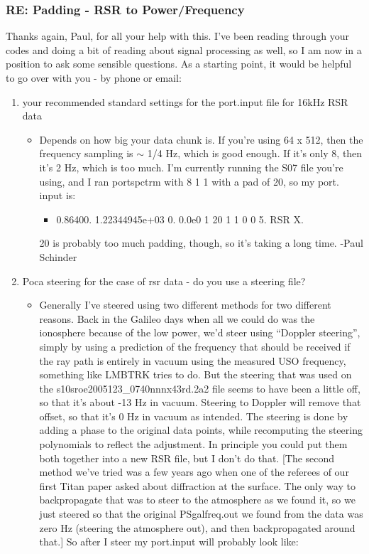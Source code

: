 \documentclass[crop=false,class=article,oneside]{standalone}
\begin{document}
\subsubsection{\footnotesize RE: Padding - RSR to Power/Frequency}
Thanks again, Paul, for all your help with this. I've been reading through your codes and doing a bit of reading about signal processing as well, so I am now in a position to ask some sensible questions. As a starting point, it would be helpful to go over with you - by phone or email:
\begin{enumerate}
    \item your recommended standard settings for the port.input file for 16kHz RSR data
    \begin{itemize}
        \item Depends on how big your data chunk is. If you’re using 64 x 512, then the frequency sampling is $\sim$ 1/4 Hz, which is good enough.  If it’s only 8, then it’s 2 Hz, which is too much. I’m currently running the S07 file you’re using, and I ran portspctrm with 8 1 1 with a pad of 20, so my port. input is:
        \begin{itemize}
            \item 0.86400. 1.22344945e+03 0. 0.0e0 1 20 1 1 0 0 5. RSR X.
        \end{itemize}
        20 is probably too much padding, though, so it’s taking a long time. -Paul Schinder
    \end{itemize}
    \item  Poca steering for the case of rsr data - do you use a steering file?
    \begin{itemize}
        \item Generally I’ve steered using two different methods for two different reasons.  Back in the Galileo days when all we could do was the ionosphere because of the low power, we’d steer using “Doppler steering”, simply by using a prediction of the frequency that should be received if the ray path is entirely in vacuum using the measured USO frequency, something like LMBTRK tries to do.  But the steering that was used on the s10sroe2005123\_0740nnnx43rd.2a2 file seems to have been a little off, so that it's about -13 Hz in vacuum.  Steering to Doppler will remove that offset, so that it’s 0 Hz in vacuum as intended.  The steering is done by adding a phase to the original data points, while recomputing the steering polynomials to reflect the adjustment.  In principle you could put them both together into a new RSR file, but I don’t do that. [The second method we’ve tried was a few years ago when one of the referees of our first Titan paper asked about diffraction at the surface.  The only way to backpropagate that was to steer to the atmosphere as we found it, so we just steered so that the original PSgalfreq.out we found from the data was zero Hz (steering the atmosphere out), and then backpropagated around that.] So after I steer my port.input will probably look like:

\end{itemize}
\end{enumerate}
\end{document}
